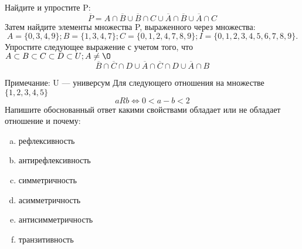 \documentclass[10pt]{exam}
\begin{document}
\begin{questions}
\question
Найдите и упростите P:
\begin{equation*}
\overline{P} = A \cap \overline{B} \cup \overline{B} \cap C \cup \overline{A} \cap \overline{B} \cup \overline{A} \cap C
\end{equation*}
Затем найдите элементы множества P, выраженного через множества:
\begin{equation*}
A = \{0, 3, 4, 9\}; 
B = \{1, 3, 4, 7\};
C = \{0, 1, 2, 4, 7, 8, 9\};
I = \{0, 1, 2, 3, 4, 5, 6, 7, 8, 9\}.
\end{equation*}\question
Упростите следующее выражение с учетом того, что $A\subset B \subset C \subset D \subset U; A \neq \O$
\begin{equation*}
\overline{B} \cap \overline{C} \cap D \cup \overline{A} \cap \overline{C} \cap D \cup \overline{A} \cap B
\end{equation*}

Примечание: U — универсум\question
Для следующего отношения на множестве $\{1, 2, 3, 4, 5\}$ 
\begin{equation*}
aRb \iff 0 < a-b<2
\end{equation*}
Напишите обоснованный ответ какими свойствами обладает или не обладает отношение и почему:   
\begin{enumerate} [a)]\setcounter{enumi}{0}
\item рефлексивность
\item антирефлексивность
\item симметричность
\item асимметричность
\item антисимметричность
\item транзитивность
\end{enumerate}


\end{questions}
\end{document}
